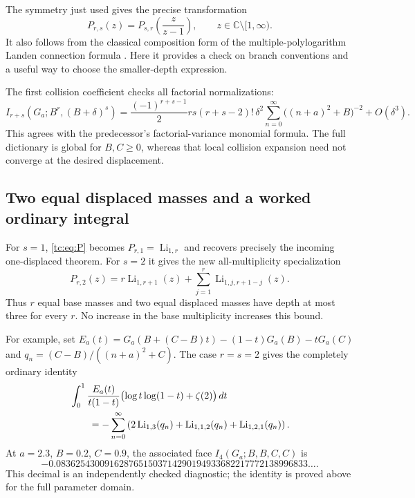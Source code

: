 \documentclass[11pt,a4paper]{article}
\numberwithin{equation}{section}
\theoremstyle{definition}
\theoremstyle{remark}
\begin{document}
The symmetry just used gives the precise transformation
\begin{equation}\label{tc:eq:Landen}
 P_{r,s}(z)=P_{s,r}\!\left(\frac{z}{z-1}\right),
       \qquad z\in\mathbb C\setminus[1,\infty).
\end{equation}
It also follows from the classical composition form of the
multiple-polylogarithm Landen connection formula
\cite{okudaueno}.  Here it provides a check on branch conventions
and a useful way to choose the smaller-depth expression.

The first collision coefficient checks all factorial normalizations:
\begin{equation}\label{tc:eq:collision-check}
 I_{r+s}(G_a;B^r,(B+\delta)^s)
  =\frac{(-1)^{r+s-1}}2rs(r+s-2)!\,
     \delta^2\sum_{n=0}^{\infty}
                     \bigl((n+a)^2+B\bigr)^{-2}
       +O(\delta^3).
\end{equation}
This agrees with the predecessor's factorial-variance monomial
formula.  The full dictionary is global for $B,C\ge0$, whereas
that local collision expansion need not converge at the desired
displacement.

\subsection{Two equal displaced masses and a worked ordinary integral}

For $s=1$, \eqref{tc:eq:P} becomes
$P_{r,1}=\operatorname{Li}_{1,r}$ and recovers precisely the
incoming one-displaced theorem.  For $s=2$ it gives the new
all-multiplicity specialization
\begin{equation}\label{tc:eq:two-displaced}
 \boxed{\displaystyle
 P_{r,2}(z)=r\operatorname{Li}_{1,r+1}(z)
     +\sum_{j=1}^{r}\operatorname{Li}_{1,j,r+1-j}(z).}
\end{equation}
Thus $r$ equal base masses and two equal displaced masses have
depth at most three for every $r$.  No increase in the base
multiplicity increases this bound.

For example, set
$E_a(t)=G_a(B+(C-B)t)-(1-t)G_a(B)-tG_a(C)$ and
$q_n=(C-B)/((n+a)^2+C)$.  The case $r=s=2$ gives the completely
ordinary identity
\begin{align}
 &\int_0^1\frac{E_a(t)}{t(1-t)}
                 \bigl(\log t\log(1-t)+\zeta(2)\bigr)\,dt
       \notag\\
 &\qquad=-\sum_{n=0}^{\infty}
   \left(2\operatorname{Li}_{1,3}(q_n)
         +\operatorname{Li}_{1,1,2}(q_n)
         +\operatorname{Li}_{1,2,1}(q_n)\right).
                                                     \label{tc:eq:worked-integral}
\end{align}
At $a=2.3$, $B=0.2$, $C=0.9$, the associated face
$I_4(G_a;B,B,C,C)$ is
\[
 -0.0836254300916287651503714290194933682217772138996833\ldots.
\]
This decimal is an independently checked diagnostic; the identity
is proved above for the full parameter domain.
\end{document}
